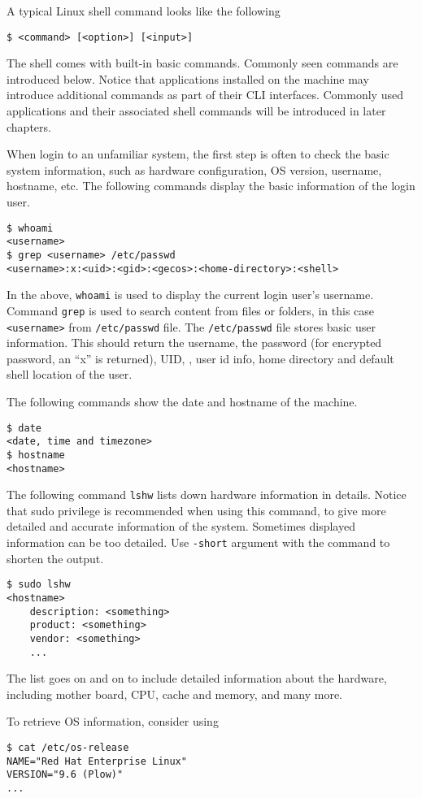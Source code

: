 A typical Linux shell command looks like the following
\begin{lstlisting}
$ <command> [<option>] [<input>]
\end{lstlisting}

The shell comes with built-in basic commands. Commonly seen commands are introduced below. Notice that applications installed on the machine may introduce additional commands as part of their CLI interfaces. Commonly used applications and their associated shell commands will be introduced in later chapters.

When login to an unfamiliar system, the first step is often to check the basic system information, such as hardware configuration, OS version, username, hostname, etc. The following commands display the basic information of the login user.
\begin{lstlisting}
$ whoami
<username>
$ grep <username> /etc/passwd
<username>:x:<uid>:<gid>:<gecos>:<home-directory>:<shell>
\end{lstlisting}
In the above, \verb|whoami| is used to display the current login user's username. Command \verb|grep| is used to search content from files or folders, in this case \verb|<username>| from \verb|/etc/passwd| file. The \verb|/etc/passwd| file stores basic user information. This should return the username, the password (for encrypted password, an ``x'' is returned), UID, , user id info, home directory and default shell location of the user.

The following commands show the date and hostname of the machine.
\begin{lstlisting}
$ date
<date, time and timezone>
$ hostname
<hostname>
\end{lstlisting}

The following command \verb|lshw| lists down hardware information in details. Notice that sudo privilege is recommended when using this command, to give more detailed and accurate information of the system. Sometimes displayed information can be too detailed. Use \verb|-short| argument with the command to shorten the output.
\begin{lstlisting}
$ sudo lshw
<hostname>
    description: <something>
    product: <something>
    vendor: <something>
    ...
\end{lstlisting}
The list goes on and on to include detailed information about the hardware, including mother board, CPU, cache and memory, and many more.

To retrieve OS information, consider using
\begin{lstlisting}
$ cat /etc/os-release
NAME="Red Hat Enterprise Linux"
VERSION="9.6 (Plow)"
...
\end{lstlisting}

